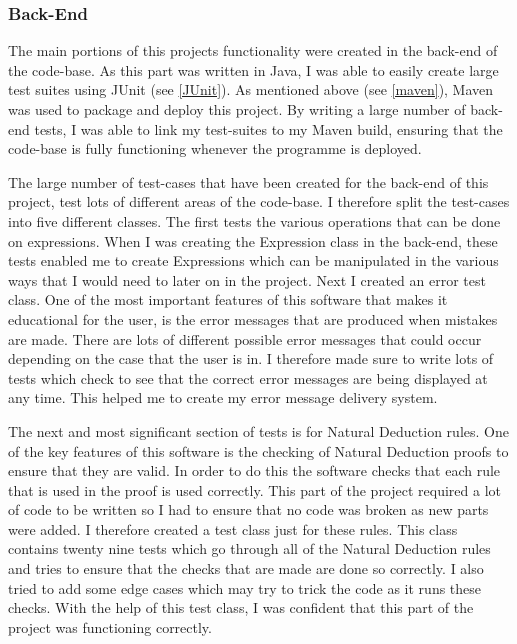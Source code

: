 \subsubsection{Back-End}
The main portions of this projects functionality were created in the back-end of the code-base. As this part was written in Java, I was able to easily create large test suites using JUnit (see \ref{JUnit}). As mentioned above (see \ref{maven}), Maven was used to package and deploy this project. By writing a large number of back-end tests, I was able to link my test-suites to my Maven build, ensuring that the code-base is fully functioning whenever the programme is deployed.

The large number of test-cases that have been created for the back-end of this project, test lots of different areas of the code-base. I therefore split the test-cases into five different classes. The first tests the various operations that can be done on expressions. When I was creating the Expression class in the back-end, these tests enabled me to create Expressions which can be manipulated in the various ways that I would need to later on in the project. Next I created an error test class. One of the most important features of this software that makes it educational for the user, is the error messages that are produced when mistakes are made. There are lots of different possible error messages that could occur depending on the case that the user is in. I therefore made sure to write lots of tests which check to see that the correct error messages are being displayed at any time. This helped me to create my error message delivery system. 

The next and most significant section of tests is for Natural Deduction rules. One of the key features of this software is the checking of Natural Deduction proofs to ensure that they are valid. In order to do this the software checks that each rule that is used in the proof is used correctly. This part of the project required a lot of code to be written so I had to ensure that no code was broken as new parts were added. I therefore created a test class just for these rules. This class contains twenty nine tests which go through all of the Natural Deduction rules and tries to ensure that the checks that are made are done so correctly. I also tried to add some edge cases which may try to trick the code as it runs these checks. With the help of this test class, I was confident that this part of the project was functioning correctly.

